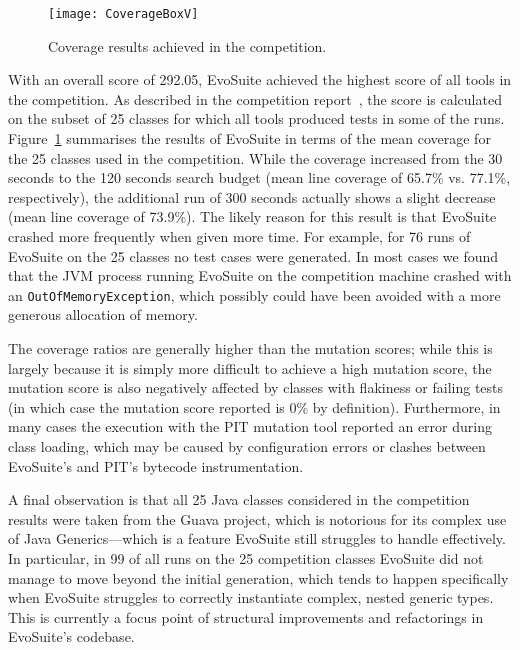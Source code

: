 \documentclass[10pt,conference]{IEEEtran}
\newcommand{\EVOSUITE}{{\sc EvoSuite}\xspace}
\begin{document}
\begin{figure}
	\centering
	\texttt{[image: CoverageBoxV]}
	\vspace{-2em}
	\caption{\label{fig:results}Coverage results achieved in the competition.}
	\vspace{-1em}
\end{figure}


With an overall score of 292.05, \EVOSUITE achieved the highest score of all
tools in the competition. As described in the competition
report~\cite{SBST:2021}, the score is calculated on the subset of 25 classes
for which all tools produced tests in some of the runs.
Figure~\ref{fig:results} summarises the results of \EVOSUITE in terms of the
mean coverage for the 25 classes used in the competition. While the coverage
increased from the 30 seconds to the 120 seconds search budget (mean line
coverage of 65.7\% vs. 77.1\%, respectively), the additional run of 300 seconds
actually shows a slight decrease (mean line coverage of 73.9\%). The likely
reason for this result is that \EVOSUITE crashed more frequently when given
more time. For example, for 76 runs of \EVOSUITE on the 25 classes no test
cases were generated. In most cases we found that the JVM process running
\EVOSUITE on the competition machine crashed with an
\texttt{OutOfMemoryException}, which possibly could have been avoided with a
more generous allocation of memory.

The coverage ratios are generally higher than the mutation scores; while this is largely because it is simply more difficult to achieve a high mutation score, the mutation score is also negatively affected by classes with flakiness or failing tests (in which case the mutation score reported is 0\% by definition). Furthermore, in many cases the execution with the PIT mutation tool reported an error during class loading, which may be caused by configuration errors or clashes between \EVOSUITE's and PIT's bytecode instrumentation.


A final observation is that all 25 Java classes considered in the competition
results were taken from the Guava project, which is notorious for its complex
use of Java Generics---which is a feature \EVOSUITE still struggles to handle
effectively. In particular, in 99 of all runs on the 25 competition classes
\EVOSUITE did not manage to move beyond the initial generation, which tends to
happen specifically when \EVOSUITE struggles to correctly instantiate complex,
nested generic types. This is currently a focus point of structural
improvements and refactorings in \EVOSUITE's codebase.
\end{document}
